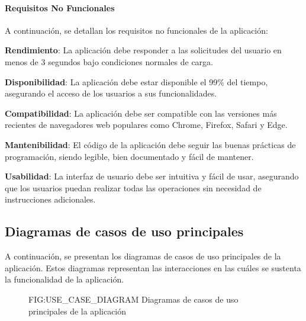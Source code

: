 \paragraph{\textbf{Requisitos No Funcionales}}

A continuación, se detallan los requisitos no funcionales de la aplicación:

\begin{nonfunctional}
    \item \textbf{Rendimiento}: La aplicación debe responder a las solicitudes del usuario en menos de 3 segundos bajo condiciones normales de carga.
    \item \textbf{Disponibilidad}: La aplicación debe estar disponible el 99\% del tiempo, asegurando el acceso de los usuarios a sus funcionalidades.
    \item \textbf{Compatibilidad}: La aplicación debe ser compatible con las versiones más recientes de navegadores web populares como Chrome, Firefox, Safari y Edge.
    \item \textbf{Mantenibilidad}: El código de la aplicación debe seguir las buenas prácticas de programación, siendo legible, bien documentado y fácil de mantener.
    \item \textbf{Usabilidad}: La interfaz de usuario debe ser intuitiva y fácil de usar, asegurando que los usuarios puedan realizar todas las operaciones sin necesidad de instrucciones adicionales.
\end{nonfunctional}

\subsection{Diagramas de casos de uso principales\label{SEC:CASOS_USO}}

A continuación, se presentan los diagramas de casos de uso principales de la aplicación. Estos diagramas representan las interacciones en las cuáles
se sustenta la funcionalidad de la aplicación.

\begin{figure}[Diagramas de casos de uso principales de la aplicación]{FIG:USE_CASE_DIAGRAM}
    {Diagramas de casos de uso principales de la aplicación}
     \quad
\end{figure}

\newpage
